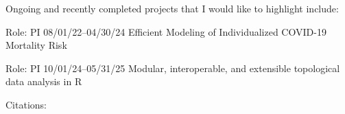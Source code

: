 \documentclass{nihbiosketch}
\begin{document}
\begin{statement}

\bigskip

\noindent
Ongoing and recently completed projects that I would like to highlight include:

\bigskip

{Role: PI}
{08/01/22--04/30/24}
{Efficient Modeling of Individualized COVID-19 Mortality Risk}

\bigskip

{Role: PI}
{10/01/24--05/31/25}
{Modular, interoperable, and extensible topological data analysis in R}

\bigskip

\noindent
Citations:

\begin{enumerate}


\end{enumerate}
\end{statement}
\end{document}
